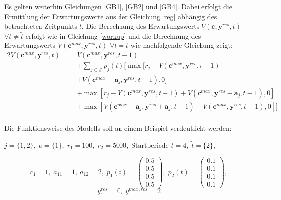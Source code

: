 Es gelten weiterhin Gleichungen \eqref{GB1}, \eqref{GB2} und \eqref{GB4}. Dabei erfolgt die Ermittlung der Erwartungswerte aus der Gleichung \eqref{reg} abhängig des betrachteten Zeitpunkts $t$. Die Berechnung des Erwartungswerts $V(\textbf{c}, \textbf{y}^{res}, t)$ $\forall t\neq\tilde{t}$ erfolgt wie in Gleichung \eqref{workup} und die Berechnung des Erwartungswerts $V(\textbf{c}^{max}, \textbf{y}^{res}, t)$ $\forall t=\tilde{t}$ wie nachfolgende Gleichung zeigt:
\begin{alignat*}{2}
 V(\textbf{c}^{max}, \textbf{y}^{res}, t) = \;& V(\textbf{c}^{max}, \textbf{y}^{res}, t-1)\\
&+ \sum_{j \in \mathcal{J}}p_{j}(t)[\max[r_{j} - V(\textbf{c}^{max}, \textbf{y}^{res}, t-1)\\
&+ V(\textbf{c}^{max}-\textbf{a}_j, \textbf{y}^{res}, t-1),0] \\
&+ \max[r_{j} - V(\textbf{c}^{max}, \textbf{y}^{res}, t-1) + V(\textbf{c}^{max}, \textbf{y}^{res}-\textbf{a}_j, t-1),0]\\
&+ \max[V(\textbf{c}^{max}-\textbf{a}_j, \textbf{y}^{res}+\textbf{a}_j, t-1) - V(\textbf{c}^{max}, \textbf{y}^{res}, t-1) ,0]]\\
\end{alignat*}

Die Funktionsweise des Modells soll an einem Beispiel verdeutlicht werden:
\begin{center}
$j = \{1, 2\}, \; h = \{1\}, \; r_{1} = 100, \; r_{2} = 5000, \; \text{Startperiode } t=4, \; \tilde{t}=\{2\} $,
\end{center}
\[
    c_{1}=1, \;
    a_{11}=1, \;
     a_{12}=2, \;
     p_{1}(t)=\begin{pmatrix} 0.5\\ 0.5\\ 0.5\\ 0.5  \end{pmatrix}, \;
     p_{2}(t)=\begin{pmatrix} 0.1\\ 0.1\\ 0.1\\ 0.1  \end{pmatrix},
  \]
  \[
    y_{1}^{res}= 0, \;
    y^{max,res}=2
      \]
      
